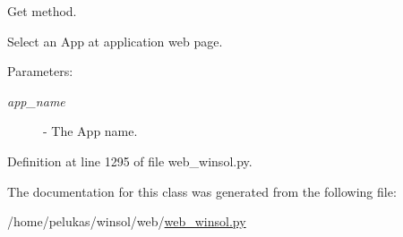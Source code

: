 Get method. 

Select an App at application web page.

\begin{Desc}
\item[Parameters:]
\begin{description}
\item[{\em app\_\-name}]- The App name. \end{description}
\end{Desc}


Definition at line 1295 of file web\_\-winsol.py.

The documentation for this class was generated from the following file:\begin{CompactItemize}
\item 
/home/pelukas/winsol/web/\hyperlink{web__winsol_8py}{web\_\-winsol.py}\end{CompactItemize}
